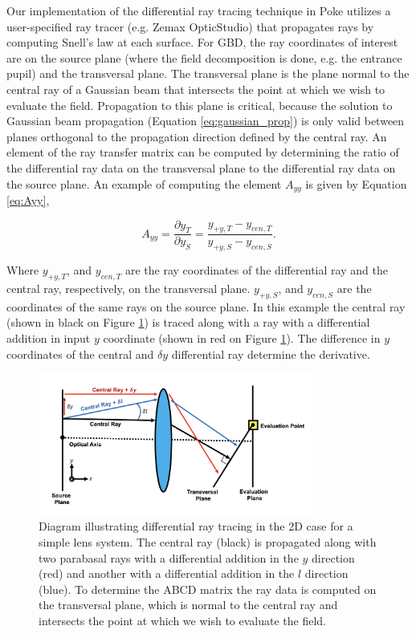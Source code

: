 Our implementation of the differential ray tracing technique in Poke utilizes a user-specified ray tracer (e.g. Zemax OpticStudio) that propagates rays by computing Snell's law at each surface. For GBD, the ray coordinates of interest are on the source plane (where the field decomposition is done, e.g. the entrance pupil) and the transversal plane. The transversal plane is the plane normal to the central ray of a Gaussian beam that intersects the point at which we wish to evaluate the field. Propagation to this plane is critical, because the solution to Gaussian beam propagation (Equation \ref{eq:gaussian_prop}) is only valid between planes orthogonal to the propagation direction defined by the central ray. An element of the ray transfer matrix can be computed by determining the ratio of the differential ray data on the transversal plane to the differential ray data on the source plane. An example of computing the element $A_{yy}$ is given by Equation \ref{eq:Ayy}, 

\begin{equation}
    A_{yy} = \frac{\partial y_{T}}{\partial y_{S}} = \frac{y_{+y,T} - y_{cen,T}}{y_{+y,S} - y_{cen,S}}.
    \label{eq:Ayy}
\end{equation}

Where $y_{+y,T}$, and $y_{cen,T}$ are the ray coordinates of the differential ray and the central ray, respectively, on the transversal plane. $y_{+y,S}$, and $y_{cen,S}$ are the coordinates of the same rays on the source plane.  In this example the central ray (shown in black on Figure \ref{fig:diffdiagram}) is traced along with a ray with a differential addition in input $y$ coordinate (shown in red on Figure \ref{fig:diffdiagram}). The difference in $y$ coordinates of the central and $\delta y$ differential ray determine the derivative. 

\begin{figure}[H]
    \centering
    \includegraphics[width=0.8\textwidth]{differential_diagram_2.png}
    \caption{Diagram illustrating differential ray tracing in the 2D case for a simple lens system. The central ray (black) is propagated along with two parabasal rays with a differential addition in the $y$ direction (red) and another with a differential addition in the $l$ direction (blue). To determine the ABCD matrix the ray data is computed on the transversal plane, which is normal to the central ray and intersects the point at which we wish to evaluate the field.}
    \label{fig:diffdiagram}
\end{figure}

